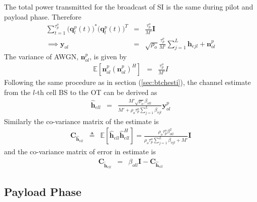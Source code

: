 \documentclass[10pt, a4paper, twoside,fleqn]{article}
\begin{document}
The total power transmitted for the broadcast of SI is the same during pilot and payload phase. Therefore
\begin{eqnarray}
    \sum\limits_{t=1}^{\tau_p^o}\Big(\pmb{q}^p_{l}(t)\Big)^*\Big(\pmb{q}^p_{l}(t)\Big)^T&=&\frac{\tau_p^o}{M'}\pmb{I} \\
\implies \pmb{y}_{ol} &=& \sqrt{\rho_o}\frac{\tau_p^o}{M'}\sum_{j=1}^{L}\pmb{h}_{ejl}+\pmb{n}^p_{ol}
\end{eqnarray}
The variance of AWGN, $\pmb{n}_{ol}^p$, is given by
\begin{eqnarray}
	\mathbb{E}[\pmb{n}^p_{ol}(\pmb{n}^p_{ol})^H] &=& \frac{\tau_p^o}{M'}I \nonumber
\end{eqnarray}
Following the same procedure as in section (\ref{sec:btchesti}), the channel estimate from the $l$-th cell BS to the OT can be derived as 
\begin{eqnarray}\label{eqn:otchesti}
	\pmb{\hat h}_{ell} &=& \frac{M'\sqrt{\rho_o}\beta_{oll}}{M'+\rho_o\tau_p^o\sum\limits_{j=1}^{L}\beta_{ojl}}\pmb{y}^p_{ol}
\end{eqnarray}
Similarly the co-variance matrix of the estimate is
\begin{eqnarray}
	\pmb{C}_{\pmb{\hat h}_{ell}} &\triangleq& \mathbb{E}[\pmb{\hat h}_{ell}\pmb{\hat h}^H_{ell}] = \frac{\rho_o\tau_p^o\beta^2_{oll}}{\rho_o\tau_p^o\sum\limits_{j=1}^{L}\beta_{ojl}+M'}\pmb{I}
\end{eqnarray}
and the co-variance matrix of error in estimate is
\begin{eqnarray}
	\pmb{C}_{\pmb{\widetilde{h}}_{ell}} &=& \beta_{oll}\pmb{I} - 	\pmb{C}_{\pmb{\hat h}_{ell}}
\end{eqnarray}
\subsection{Payload Phase}
\end{document}
